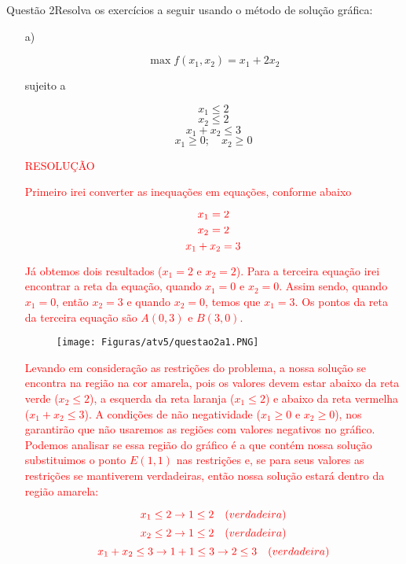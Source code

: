 \documentclass[12pt]{article}
\begin{document}
\begin{section}{Questão 2}{Resolva os exercícios a seguir usando o método de solução gráfica:}

\begin{itemize}
    \item[a)]
    
$$
\max f(x_1,x_2) = x_1 + 2x_2
$$

sujeito a 

$$
x_1 \leq 2
$$
$$
x_2 \leq 2
$$
$$
x_1 + x_2 \leq 3
$$
$$
x_1 \geq 0; \quad x_2 \geq 0
$$

\noindent \textcolor{red}{RESOLUÇÃO}

\textcolor{red}{Primeiro irei converter as inequações em equações, conforme abaixo}

$$
\textcolor{red}{x_1 = 2}
$$
$$
\textcolor{red}{x_2 = 2}
$$
$$
\textcolor{red}{x_1 + x_2 = 3}
$$

\noindent \textcolor{red}{Já obtemos dois resultados ($x_1 = 2$ e $x_2 = 2$). Para a terceira equação irei encontrar a reta da equação, quando $x_1=0$ e $x_2=0$. Assim sendo, quando $x_1=0$, então $x_2 =3$ e quando $x_2=0$, temos que $x_1 =3$. Os pontos da reta da terceira equação são $A(0,3)$ e $B(3,0)$.}

\begin{figure}[H]
    \centering
    \texttt{[image: Figuras/atv5/questao2a1.PNG]}
\end{figure}

\textcolor{red}{Levando em consideração as restrições do problema, a nossa solução se encontra na região na cor amarela, pois os valores devem estar abaixo da reta verde ($x_2 \leq 2$), a esquerda da reta laranja ($x_1 \leq 2$) e abaixo da reta vermelha ($x_1 + x_2 \leq 3$). A condições de não negatividade ($x_1 \geq 0$ e $x_2 \geq 0$), nos garantirão que não usaremos as regiões com valores negativos no gráfico.}\\

\textcolor{red}{Podemos analisar se essa região do gráfico é a que contém nossa solução substituimos o ponto $E(1,1)$ nas restrições e, se para seus valores as restrições se mantiverem verdadeiras, então nossa solução estará dentro da região amarela:}

$$
\textcolor{red}{x_1 \leq 2 \rightarrow 1 \leq 2 \quad \textrm(verdadeira)}
$$
$$
\textcolor{red}{x_2 \leq 2 \rightarrow 1 \leq 2 \quad \textrm(verdadeira)}
$$
$$
\textcolor{red}{x_1 + x_2 \leq 3 \rightarrow 1+1 \leq 3 \rightarrow 2 \leq 3 \quad \textrm(verdadeira)}
$$


\end{itemize}
\end{section}
\end{document}
